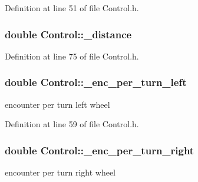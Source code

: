 Definition at line 51 of file Control.\-h.

\hypertarget{classControl_a1c3805dd46c4de62a6209bf5ed6b3b93}{
\subsubsection[{\-\_\-distance}]{\setlength{\rightskip}{0pt plus 5cm}double Control\-::\-\_\-distance\hspace{0.3cm}{\ttfamily [private]}}}\label{classControl_a1c3805dd46c4de62a6209bf5ed6b3b93}


Definition at line 75 of file Control.\-h.

\hypertarget{classControl_acc9c73871491bc8ac005980ae81d9410}{
\subsubsection[{\-\_\-enc\-\_\-per\-\_\-turn\-\_\-left}]{\setlength{\rightskip}{0pt plus 5cm}double Control\-::\-\_\-enc\-\_\-per\-\_\-turn\-\_\-left\hspace{0.3cm}{\ttfamily [private]}}}\label{classControl_acc9c73871491bc8ac005980ae81d9410}


encounter per turn left wheel 



Definition at line 59 of file Control.\-h.

\hypertarget{classControl_a9f09be60ba816c6c3fb91c47129d2cd1}{
\subsubsection[{\-\_\-enc\-\_\-per\-\_\-turn\-\_\-right}]{\setlength{\rightskip}{0pt plus 5cm}double Control\-::\-\_\-enc\-\_\-per\-\_\-turn\-\_\-right\hspace{0.3cm}{\ttfamily [private]}}}\label{classControl_a9f09be60ba816c6c3fb91c47129d2cd1}


encounter per turn right wheel 




